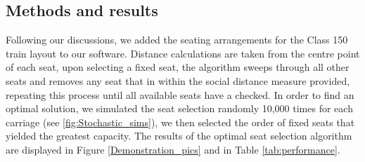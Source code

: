 \documentclass[11pt,a4paper]{article}
\begin{document}
\begin{itemize}
\section*{Methods and results}

Following our discussions, we added the seating arrangements for the Class 150 train layout to our software. Distance calculations are taken from the centre point of each seat, upon selecting a fixed seat, the algorithm sweeps through all other seats and removes any seat that in within the social distance measure provided, repeating this process until all available seats have a checked. In order to find an optimal solution, we simulated the seat selection randomly 10,000 times for each carriage (see \autoref{fig:Stochastic_sims}), we then selected the order of fixed seats that yielded the greatest capacity. The results of the optimal seat selection algorithm are displayed in Figure \ref{Demonstration_pics} and in Table \ref{tab:performance}. 




\end{itemize}
\end{document}
